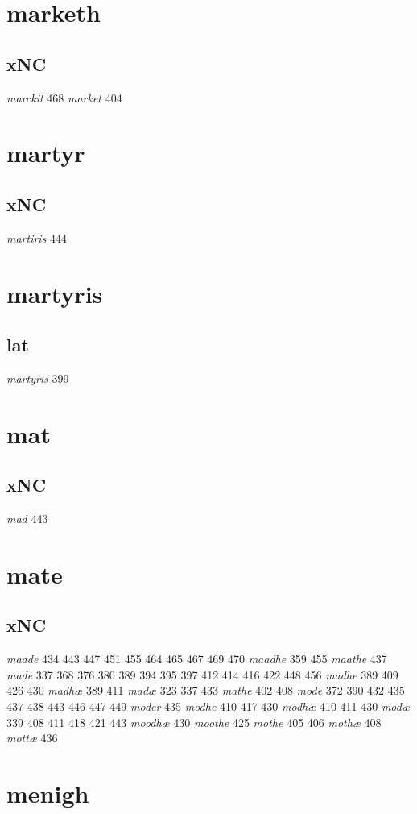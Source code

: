 \documentclass[a4paper,twocolumn]{article}
\begin{document}
\section{marketh}
\label{sec:orgdea3e57}
\subsection{xNC}
\label{sec:orgee61b20}
\emph{marckit} 468 \emph{market} 404 
\section{martyr}
\label{sec:orgd1ab85b}
\subsection{xNC}
\label{sec:org28a6bb0}
\emph{martiris} 444 
\section{martyris}
\label{sec:orgfa0885c}
\subsection{lat}
\label{sec:org2b8ef4e}
\emph{martyris} 399 
\section{mat}
\label{sec:orga6879e9}
\subsection{xNC}
\label{sec:org99f3f1c}
\emph{mad} 443 
\section{mate}
\label{sec:org7bae7dd}
\subsection{xNC}
\label{sec:orgb7576aa}
\emph{maade} 434 443 447 451 455 464 465 467 469 470 \emph{maadhe} 359 455 \emph{maathe} 437 \emph{made} 337 368 376 380 389 394 395 397 412 414 416 422 448 456 \emph{madhe} 389 409 426 430 \emph{madhæ} 389 411 \emph{madæ} 323 337 433 \emph{mathe} 402 408 \emph{mode} 372 390 432 435 437 438 443 446 447 449 \emph{moder} 435 \emph{modhe} 410 417 430 \emph{modhæ} 410 411 430 \emph{modæ} 339 408 411 418 421 443 \emph{moodhæ} 430 \emph{moothe} 425 \emph{mothe} 405 406 \emph{mothæ} 408 \emph{mottæ} 436 
\section{menigh}
\label{sec:orgfd3cec5}
\end{document}
